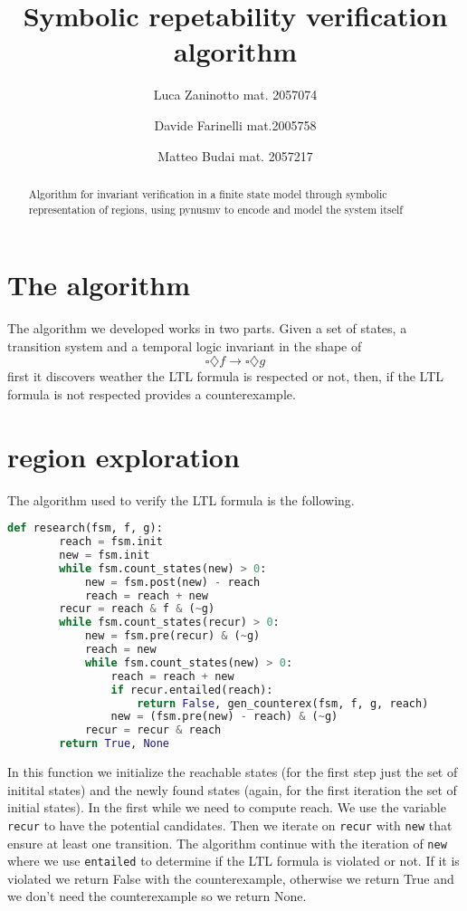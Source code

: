 \documentclass[9pt,oneside]{amsart}
\title{Symbolic repetability verification algorithm}
\author{
  Luca Zaninotto mat. 2057074 
  \and
  Davide Farinelli mat.2005758
  \and
  Matteo Budai mat. 2057217
}
\begin{document}
\begin{abstract}
  Algorithm for invariant verification in a finite state model through
  symbolic representation of regions, using pynusmv to encode and
  model the system itself
\end{abstract}
\maketitle
\setlength{\columnsep}{20pt}
\begin{multicols}{2}
  \section{The algorithm}\label{algo}
  The algorithm we developed works in two parts. Given a set of
  states, a transition system and a temporal logic invariant in the
  shape of
  \[
    \square \diamondsuit f \rightarrow \square \diamondsuit g
  \]
  first it discovers weather the LTL formula is respected or not, then,
  if the LTL formula is not respected provides a counterexample.
  \section{region exploration}\label{explore}
  The algorithm used to verify the LTL formula is the following.
  \begin{lstlisting}[language=Python]
  	def research(fsm, f, g):
  		reach = fsm.init
  		new = fsm.init
  		while fsm.count_states(new) > 0:
  			new = fsm.post(new) - reach
  			reach = reach + new
  		recur = reach & f & (~g)
  		while fsm.count_states(recur) > 0:
	  		new = fsm.pre(recur) & (~g)
		  	reach = new
		  	while fsm.count_states(new) > 0:
		  		reach = reach + new
		  		if recur.entailed(reach):
		  			return False, gen_counterex(fsm, f, g, reach)
		  		new = (fsm.pre(new) - reach) & (~g)
			recur = recur & reach
	  	return True, None
  \end{lstlisting}\label{code:reachable}
	In this function we initialize the reachable states (for the first step just the
	set of initital states) and the newly found states (again,
	for the first iteration the set of initial states).
	In the first while we need to compute reach.
	We use the variable \texttt{recur} to have the potential candidates.
	Then we iterate on \texttt{recur} with \texttt{new} that ensure at least one transition.
	The algorithm continue with the iteration of \texttt{new} where we use \texttt{entailed} to determine if the LTL formula is violated or not. 
	If it is violated we return False with the counterexample, otherwise we return True and we don't need the counterexample so we return None.


\end{multicols}
\end{document}
